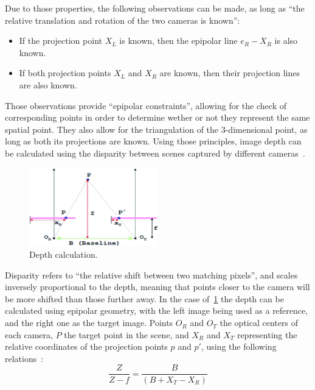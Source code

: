Due to those properties, the following observations can be made, as long as ``the relative 
translation and rotation of the two cameras is known'':
\begin{itemize}
    \item If the projection point \(X_{L}\) is known, then the epipolar line \(e_{R} - X_{R}\)
is also known.
    \item If both projection points \(X_{L}\) and \(X_{R}\) are known, then their projection lines
are also known.
\end{itemize}

Those observations provide ``epipolar constraints'', allowing for the check of corresponding points
in order to determine wether or not they represent the same spatial point. They also allow for the
triangulation of the 3-dimensional point, as long as both its projections are known. Using those
principles, image depth can be calculated using the disparity between scenes captured by different
cameras~\cite{withApplications}.

\begin{figure}[H]
    \includegraphics[width=0.50\textwidth, height=0.25\textwidth]{resources/png/depth_calculation.png}
    \caption{Depth calculation.~\cite{withApplications}~\label{figDepthCalc}}
\end{figure}

Disparity refers to ``the relative shift between two matching pixels'', and scales inversely 
proportional to the depth, meaning that points closer to the camera will be more shifted than
those further away.  In the case of~\ref{figDepthCalc}
the depth can be calculated using epipolar geometry, with the left image being used as a reference,
and the right one as the target image. Points \(O_{R}\) and \(O_{T}\) the optical 
centers of each camera, \(P\) the target point in the scene, and \(X_{R}\) and \(X_{T}\)
representing the relative coordinates of the projection points \(p\) and \(p'\), using the
following relations~\cite{withApplications}:
\begin{equation}
    \frac{Z}{Z-f} = \frac{B}{(B + X_{T} - X_{R})}
\end{equation}

